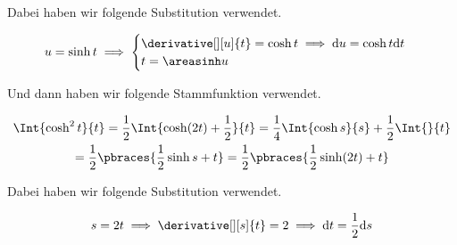 \begin{solution}
Dabei haben wir folgende Substitution verwendet.

\begin{align*}
    u = \sinh t
    \implies
    \begin{cases}
        \derivative[][u]{t} = \cosh t \implies \mathrm{d} u = \cosh t \mathrm{d} t \\
        t = \areasinh u
    \end{cases}
\end{align*}

Und dann haben wir folgende Stammfunktion verwendet.

\begin{multline*}
    \Int{\cosh^2 t}{t}
    =
    \frac{1}{2}
    \Int{\cosh(2 t) + \frac{1}{2}}{t}
    =
    \frac{1}{4}
    \Int{\cosh s}{s}
    +
    \frac{1}{2}
    \Int{}{t} \\
    =
    \frac{1}{2}
    \pbraces
    {
        \frac{1}{2}
        \sinh s
        +
        t
    }
    =
    \frac{1}{2}
    \pbraces
    {
        \frac{1}{2}
        \sinh(2 t)
        +
        t
    }
\end{multline*}

Dabei haben wir folgende Substitution verwendet.

\begin{align*}
    s = 2 t
    \implies
    \derivative[][s]{t} = 2
    \implies
    \mathrm{d} t = \frac{1}{2} \mathrm{d} s
\end{align*}

\end{solution}

